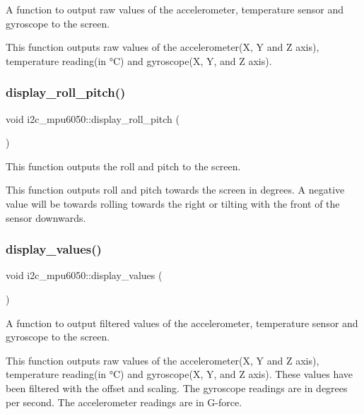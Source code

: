 A function to output raw values of the accelerometer, temperature sensor and gyroscope to the screen. 

This function outputs raw values of the accelerometer(\+X, Y and Z axis), temperature reading(in °C) and gyroscope(\+X, Y, and Z axis). \mbox{\label{classi2c__mpu6050_ab416fccb252bc742b84416ae78e48f58}} 
\subsubsection{\texorpdfstring{display\+\_\+roll\+\_\+pitch()}{display\_roll\_pitch()}}
{\footnotesize\ttfamily void i2c\+\_\+mpu6050\+::display\+\_\+roll\+\_\+pitch (\begin{DoxyParamCaption}{ }\end{DoxyParamCaption})}



This function outputs the roll and pitch to the screen. 

This function outputs roll and pitch towards the screen in degrees. A negative value will be towards rolling towards the right or tilting with the front of the sensor downwards. \mbox{\label{classi2c__mpu6050_ac5035930b0bc113e67c2838e17ae1460}} 
\subsubsection{\texorpdfstring{display\+\_\+values()}{display\_values()}}
{\footnotesize\ttfamily void i2c\+\_\+mpu6050\+::display\+\_\+values (\begin{DoxyParamCaption}{ }\end{DoxyParamCaption})}



A function to output filtered values of the accelerometer, temperature sensor and gyroscope to the screen. 

This function outputs raw values of the accelerometer(\+X, Y and Z axis), temperature reading(in °C) and gyroscope(\+X, Y, and Z axis). These values have been filtered with the offset and scaling. The gyroscope readings are in degrees per second. The accelerometer readings are in G-\/force. \mbox{\label{classi2c__mpu6050_a2c5020be3e7dda0123748577ce3346f5}} 
